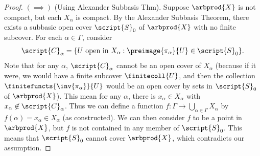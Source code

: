 \documentclass[a5paper]{article}
\theoremstyle{definition}%
\numberwithin{exercise}{section}
\theoremstyle{remark}%
\begin{document}
\begin{proof}$(\implies)$ (Using Alexander Subbasis Thm).
Suppose $\arbprod{X}$ is not compact, but each $X_\alpha$ is compact. By the Alexander Subbasis Theorem, there exists a subbasic open cover $\script{S}_0$ of $\arbprod{X}$ with no finite subcover. For each $\alpha\in\Gamma$, consider 
$$\script{C}_\alpha=\{U \text{ open in }X_\alpha: \preimage{\pi_\alpha}{U}\in\script{S}_0\}.$$
Note that for any $\alpha$, $\script{C}_\alpha$ cannot be an open cover of $X_\alpha$ (because if it were, we would have a finite subcover $\finitecoll{U}$, and then the collection $\finitefuncts{\inv{\pi_\alpha}}{U}$ would be an open cover by sets in $\script{S}_0$ of $\arbprod{X}$).
This mean for any $\alpha$, there is $x_\alpha\in X_\alpha$ with $x_\alpha\not\in\script{C}_\alpha$. 
Thus we can define a function $f:\Gamma\to \bigcup\limits_{\alpha\in\Gamma}X_\alpha$ by $f(\alpha)=x_\alpha\in X_\alpha$ (as constructed). We can then consider $f$ to be a point in $\arbprod{X}$, but $f$ is not contained in any member of $\script{S}_0$. This means that $\script{S}_0$ cannot cover $\arbprod{X}$, which contradicts our assumption. 
\end{proof}
\end{document}
